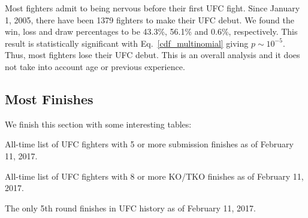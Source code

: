 Most fighters admit to being nervous before their first UFC fight.
Since January 1, 2005, there have been 1379 fighters to make their UFC debut. We found the
win, loss and draw percentages to be 43.3\%, 56.1\% and 0.6\%, respectively.
This result is statistically significant with Eq.~\ref{cdf_multinomial}
giving $p \sim 10^{-5}$. Thus, most
fighters lose their UFC debut. This is an overall analysis and it does not
take into account age or previous experience.


\subsection*{Most Finishes}
We finish this section with some interesting tables:

\begin{center}
\begin{table}[h]

\caption{All-time list of UFC fighters with 5 or more submission finishes
as of February 11, 2017.}
\end{table}
\end{center}

\begin{center}
\begin{table}[h]

\caption{All-time list of UFC fighters with 8 or more KO/TKO finishes
as of February 11, 2017.}
\end{table}
\end{center}

\begin{center}
\begin{table}[h]

\caption{The only 5th round finishes in UFC history as of February 11, 2017.}
\label{latest_finishes}
\end{table}
\end{center}
